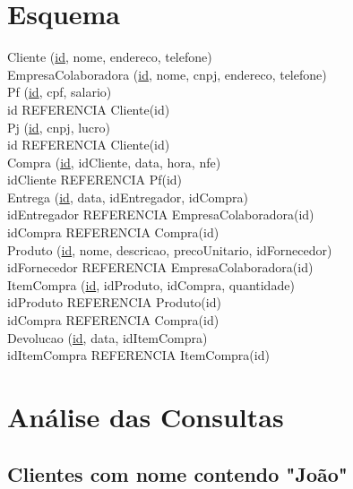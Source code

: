 \documentclass[12pt,a4paper]{article}
\begin{document}
\newpage
\section{Esquema}

\begin{flushleft}
	Cliente (\underline{id}, nome, endereco, telefone) \\[0.2cm]
	EmpresaColaboradora (\underline{id}, nome, cnpj, endereco, telefone) \\[0.2cm]
	Pf (\underline{id}, cpf, salario) \\
	\quad \quad \quad \quad id REFERENCIA Cliente(id) \\[0.2cm]
	Pj (\underline{id}, cnpj, lucro) \\
	\quad \quad \quad \quad id REFERENCIA Cliente(id) \\[0.2cm]
	Compra (\underline{id}, idCliente, data, hora, nfe) \\
	\quad \quad \quad \quad idCliente REFERENCIA Pf(id) \\[0.2cm]
	Entrega (\underline{id}, data, idEntregador, idCompra) \\
	\quad \quad \quad \quad idEntregador REFERENCIA EmpresaColaboradora(id) \\
	\quad \quad \quad \quad idCompra REFERENCIA Compra(id) \\[0.2cm]
	Produto (\underline{id}, nome, descricao, precoUnitario, idFornecedor) \\
	\quad \quad \quad \quad idFornecedor REFERENCIA EmpresaColaboradora(id) \\[0.2cm]
	ItemCompra (\underline{id}, idProduto, idCompra, quantidade) \\
	\quad \quad \quad \quad idProduto REFERENCIA Produto(id) \\
	\quad \quad \quad \quad idCompra REFERENCIA Compra(id) \\[0.2cm]
	Devolucao (\underline{id}, data, idItemCompra) \\
	\quad \quad \quad \quad idItemCompra REFERENCIA ItemCompra(id) \\
\end{flushleft}

\newpage
\section{Análise das Consultas}

\subsection{Clientes com nome contendo "João"}
\end{document}
